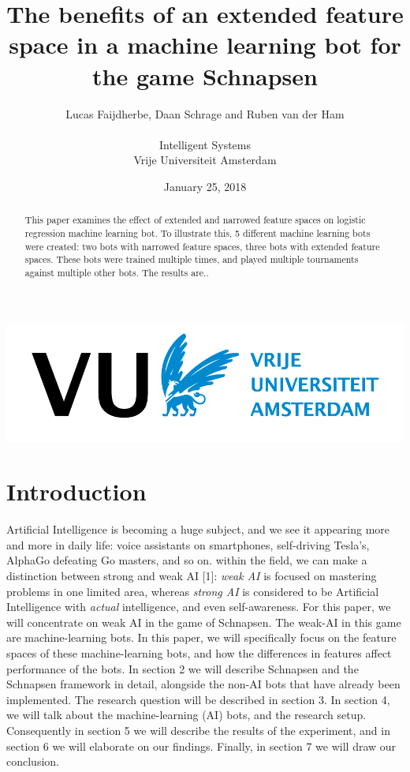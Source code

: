 \documentclass[a4paper,11pt]{article}
\title{The benefits of an extended feature space in a machine learning bot for the game Schnapsen}
\date{January 25, 2018}
\author{Lucas Faijdherbe, Daan Schrage and Ruben van der Ham\\\\
	\small Intelligent Systems\\
	\small Vrije Universiteit Amsterdam}
\begin{document}
\begin{titlepage}

\centering
\maketitle
\includegraphics[width=0.8\linewidth]{images/vulogo.png}

\end{titlepage}
\clearpage

\tableofcontents
\clearpage




\begin{abstract}
This paper examines the effect of extended and narrowed feature spaces on logistic regression machine learning bot. To illustrate this, 5 different machine learning bots were created: two bots with narrowed feature spaces, three bots with extended feature spaces. These bots were trained multiple times, and played multiple tournaments against multiple other bots. The results are.. 
\end{abstract}

\section{Introduction}
Artificial Intelligence is becoming a huge subject, and we see it appearing more and more in daily life: voice assistants on smartphones, self-driving Tesla's, AlphaGo defeating Go masters, and so on. within the field, we can make a distinction between strong and weak AI [1]: \textit{weak AI} is focused on mastering problems in one limited area, whereas \textit{strong AI} is considered to be Artificial Intelligence with \textit{actual} intelligence, and even self-awareness. For this paper, we will concentrate on weak AI in the game of Schnapsen. The weak-AI in this game are machine-learning bots. In this paper, we will specifically focus on the feature spaces of these machine-learning bots, and how the differences in features affect performance of the bots. In section 2 we will describe Schnapsen and the Schnapsen framework in detail, alongside the non-AI bots that have already been implemented. The research question will be described in section 3. In section 4, we will talk about the machine-learning (AI) bots, and the research setup. Consequently in section 5 we will describe the results of the experiment, and in section 6 we will elaborate on our findings. Finally, in section 7 we will draw our conclusion.
\end{document}
